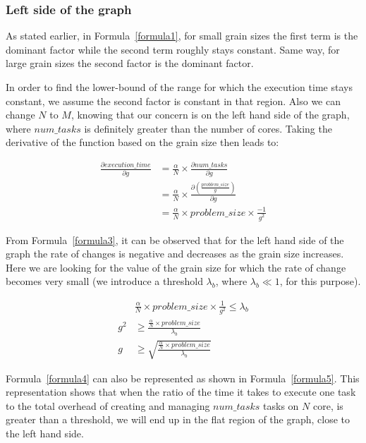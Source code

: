 \vspace{\baselineskip}
\subsubsection{Left side of the graph}
As stated earlier, in Formula~\ref{formula1}, for small grain sizes the first term is the dominant factor while the second term roughly stays constant. Same way, for large grain sizes the second factor is the dominant factor. 

In order to find the lower-bound of the range for which the execution time stays constant, we assume the second factor is constant in that region. Also we can change $N$ to $M$, knowing that our concern is on the left hand side of the graph, where $num\_{tasks}$ is definitely greater than the number of cores. 
Taking the derivative of the function based on the grain size then leads to:

 
\begin{equation}\label{formula3}
\begin{aligned}
\frac{\partial execution\_{time}}{\partial g} &= \frac{\alpha}{N}\times{\frac{\partial num\_{tasks}}{\partial g}}\\
&=\frac{\alpha}{N}\times\frac{\partial(\frac{problem\_{size}}{g})}{\partial g} \\
&=\frac{\alpha}{N}\times{problem\_{size}}\times{\frac{-1}{g^2}}
\end{aligned}
\end{equation}

From Formula~\ref{formula3}, it can be observed that for the left hand side of the graph the rate of changes is negative and decreases as the grain size increases. Here we are looking for the value of the grain size for which the rate of change becomes very small (we introduce a threshold $\lambda_b$, where $\lambda_b\ll1$, for this purpose). 


\begin{equation}\label{formula4}
\begin{aligned}
&\frac{\alpha}{N}\times{problem\_{size}}\times{\frac{1}{g^2}}\leq{\lambda_b} \\
{g^2}&\geq{\frac{\frac{\alpha}{N}\times{problem\_{size}}}{\lambda_b}}\\
{g}&\geq{\sqrt{\frac{\frac{\alpha}{N}\times{problem\_{size}}}{\lambda_b}}}
\end{aligned}
\end{equation}

Formula~\ref{formula4} can also be represented as shown in Formula~\ref{formula5}. This representation shows that when the ratio of the time it takes to execute one task to the total overhead of creating and managing $num\_{tasks}$ tasks on $N$ core, is greater than a threshold, we will end up in the flat region of the graph, close to the left hand side.


